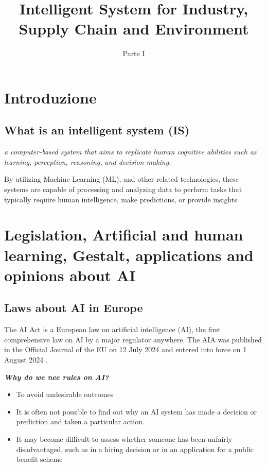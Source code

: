 \documentclass{report}
\title{\huge\textbf{{Intelligent System for Industry, Supply Chain and Environment}}}
\date{Parte I}
\begin{document}
\maketitle

\tableofcontents
\newpage

\chapter{Introduzione}

\section{What is an intelligent system (IS)}
\begin{center}
    \textit{a computer-based system that aims to replicate human cognitive abilities such as learning, perception, reasoning, and decision-making. }
\end{center}

\noindent By utilizing Machine Learning (ML), and other related technologies, these systems are capable of processing and analyzing data to perform tasks that typically require human intelligence, make predictions, or provide insights

\chapter{Legislation, Artificial and human learning, Gestalt, applications and opinions about AI}
\section{Laws about AI in Europe}
\noindent The AI Act is a European law on artificial intelligence (AI), the first comprehensive law on AI by a major regulator anywhere. 
The AIA was published in the Official Journal of the EU on 12 July 2024 and entered into force on 1 August 2024 . 


\noindent \textbf{\textit{Why do we nee rules on AI?}}
\begin{itemize}
    \item To avoid undesirable outcomes
    \item It is often not possible to find out why an AI system has made a decision or prediction and taken a particular action. 
    \item It may become difficult to assess whether someone has been unfairly disadvantaged, such as in a hiring decision or in an application for a public benefit scheme
\end{itemize}
\end{document}
